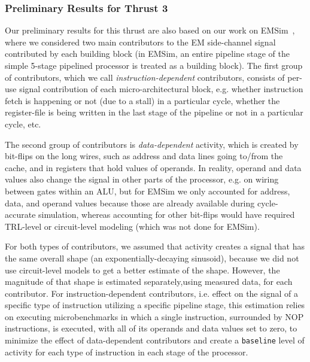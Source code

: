 \subsubsection{Preliminary Results for Thrust 3}
\label{sec:prelim-transform}

Our preliminary results for this thrust are also based on our work on EMSim~\cite{Nader2020}, where we considered two main contributors to the EM side-channel signal contributed by each building block (in EMSim, an entire pipeline stage of the simple 5-stage pipelined processor is treated as a building block). The first group of contributors, which we call \textit{instruction-dependent} contributors, consists of per-use signal contribution of each micro-architectural block, e.g. whether instruction fetch is happening or not (due to a stall) in a particular cycle, whether the register-file is being written in the last stage of the pipeline or not in a particular cycle, etc.

The second group of contributors is \textit{data-dependent} activity, which is created by bit-flips on the long wires, such as address and data lines going to/from the cache, and in registers that hold values of operands. In reality, operand and data values also change the signal in other parts of the processor, e.g. on wiring between gates within an ALU, but for EMSim we only accounted for address, data, and operand values because those are already available during cycle-accurate simulation, whereas accounting for other bit-flips would have required TRL-level or circuit-level modeling (which was not done for EMSim).

For both types of contributors, we assumed that activity creates a signal that has the same overall shape (an exponentially-decaying sinusoid), because we did not use circuit-level models to get a better estimate of the shape. However, the magnitude of that shape is estimated separately,using measured data, for each contributor. For instruction-dependent contributors, i.e. effect on the signal of a specific type of instruction utilizing a specific pipeline stage, this estimation relies on executing microbenchmarks in which a single instruction, surrounded by NOP instructions, is executed, with all of its operands and data values set to zero, to minimize the effect of data-dependent contributors and create a {\tt baseline} level of activity for each type of instruction in each stage of the processor.

